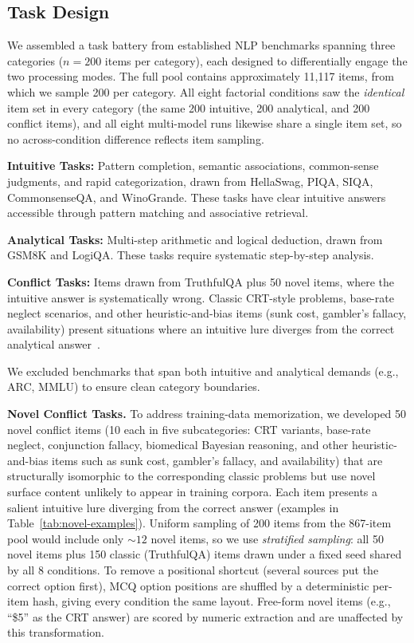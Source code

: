 \documentclass[conference]{IEEEtran}
\begin{document}
\subsection{Task Design}

We assembled a task battery from established NLP benchmarks spanning three categories ($n = 200$ items per category), each designed to differentially engage the two processing modes. The full pool contains approximately 11{,}117 items, from which we sample 200 per category. All eight factorial conditions saw the \textit{identical} item set in every category (the same 200 intuitive, 200 analytical, and 200 conflict items), and all eight multi-model runs likewise share a single item set, so no across-condition difference reflects item sampling.

\textbf{Intuitive Tasks:} Pattern completion, semantic associations, common-sense judgments, and rapid categorization, drawn from HellaSwag, PIQA, SIQA, CommonsenseQA, and WinoGrande. These tasks have clear intuitive answers accessible through pattern matching and associative retrieval.

\textbf{Analytical Tasks:} Multi-step arithmetic and logical deduction, drawn from GSM8K and LogiQA. These tasks require systematic step-by-step analysis.

\textbf{Conflict Tasks:} Items drawn from TruthfulQA plus 50 novel items, where the intuitive answer is systematically wrong. Classic CRT-style problems, base-rate neglect scenarios, and other heuristic-and-bias items (sunk cost, gambler's fallacy, availability) present situations where an intuitive lure diverges from the correct analytical answer~\cite{Frederick2005}.

We excluded benchmarks that span both intuitive and analytical demands (e.g., ARC, MMLU) to ensure clean category boundaries.

\textbf{Novel Conflict Tasks.} To address training-data memorization, we developed 50 novel conflict items (10 each in five subcategories: CRT variants, base-rate neglect, conjunction fallacy, biomedical Bayesian reasoning, and other heuristic-and-bias items such as sunk cost, gambler's fallacy, and availability) that are structurally isomorphic to the corresponding classic problems but use novel surface content unlikely to appear in training corpora. Each item presents a salient intuitive lure diverging from the correct answer (examples in Table~\ref{tab:novel-examples}). Uniform sampling of 200 items from the 867-item pool would include only ${\sim}12$ novel items, so we use \textit{stratified sampling}: all 50 novel items plus 150 classic (TruthfulQA) items drawn under a fixed seed shared by all 8 conditions. To remove a positional shortcut (several sources put the correct option first), MCQ option positions are shuffled by a deterministic per-item hash, giving every condition the same layout. Free-form novel items (e.g., ``\$5'' as the CRT answer) are scored by numeric extraction and are unaffected by this transformation.
\end{document}

